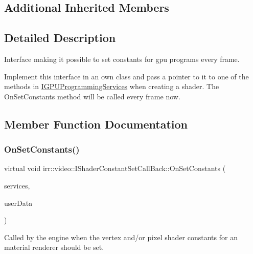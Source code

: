 \subsection*{Additional Inherited Members}


\subsection{Detailed Description}
Interface making it possible to set constants for gpu programs every frame. 

Implement this interface in an own class and pass a pointer to it to one of the methods in \hyperlink{classirr_1_1video_1_1IGPUProgrammingServices}{I\+G\+P\+U\+Programming\+Services} when creating a shader. The On\+Set\+Constants method will be called every frame now. 

\subsection{Member Function Documentation}
\mbox{\label{classirr_1_1video_1_1IShaderConstantSetCallBack_a91cf4eb8d20d278defaca4e3c9390396}} 
\subsubsection{\texorpdfstring{On\+Set\+Constants()}{OnSetConstants()}\hspace{0.1cm}{\footnotesize\ttfamily [1/2]}}
{\footnotesize\ttfamily virtual void irr\+::video\+::\+I\+Shader\+Constant\+Set\+Call\+Back\+::\+On\+Set\+Constants (\begin{DoxyParamCaption}\item[{\hyperlink{classirr_1_1video_1_1IMaterialRendererServices}{I\+Material\+Renderer\+Services} $\ast$}]{services,  }\item[{\hyperlink{namespaceirr_ac66849b7a6ed16e30ebede579f9b47c6}{s32}}]{user\+Data }\end{DoxyParamCaption})\hspace{0.3cm}{\ttfamily [pure virtual]}}



Called by the engine when the vertex and/or pixel shader constants for an material renderer should be set. 

